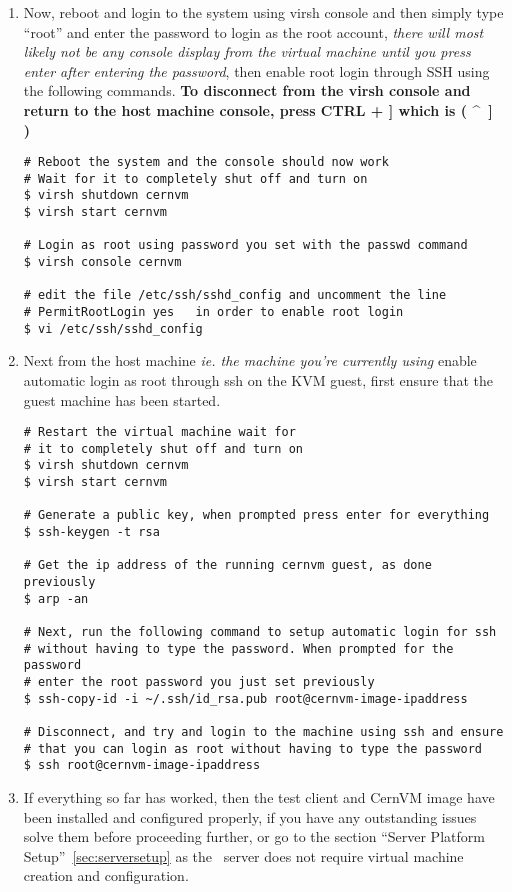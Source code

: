 \begin{enumerate}
\item	Now, reboot and login to the system using virsh console and then simply type ``root'' and enter the password to login as the 
		root account, \emph{there will most likely not be any console display from the virtual machine until you press 
		enter after entering the password}, then enable root login through SSH using the following commands. {\bf To 
		disconnect from the virsh console and return to the host machine console, press CTRL + ]  which is ( \^~] )}
		
\lstset{language=bash,caption= Enable SSH Root Login}
\begin{lstlisting}
# Reboot the system and the console should now work
# Wait for it to completely shut off and turn on
$ virsh shutdown cernvm
$ virsh start cernvm

# Login as root using password you set with the passwd command
$ virsh console cernvm

# edit the file /etc/ssh/sshd_config and uncomment the line 
# PermitRootLogin yes	in order to enable root login
$ vi /etc/ssh/sshd_config
\end{lstlisting}

\item 	Next from the host machine \emph{ie. the machine you're currently using} enable automatic login as root 
		through ssh on the KVM guest, first ensure that the guest machine has been started.

\lstset{language=bash,caption=Enable Automatic SSH Root Login}
\begin{lstlisting}
# Restart the virtual machine wait for 
# it to completely shut off and turn on
$ virsh shutdown cernvm
$ virsh start cernvm

# Generate a public key, when prompted press enter for everything
$ ssh-keygen -t rsa

# Get the ip address of the running cernvm guest, as done previously
$ arp -an

# Next, run the following command to setup automatic login for ssh
# without having to type the password. When prompted for the password
# enter the root password you just set previously
$ ssh-copy-id -i ~/.ssh/id_rsa.pub root@cernvm-image-ipaddress
		
# Disconnect, and try and login to the machine using ssh and ensure 
# that you can login as root without having to type the password
$ ssh root@cernvm-image-ipaddress
\end{lstlisting}

\item	If everything so far has worked, then the test client and CernVM image have been installed and configured properly,
		if you have any outstanding issues solve them before proceeding further, or go to the section ``Server Platform 		
		Setup''~\ref{sec:serversetup} as the \tapper~server does not require virtual machine creation and configuration.
\end{enumerate}


